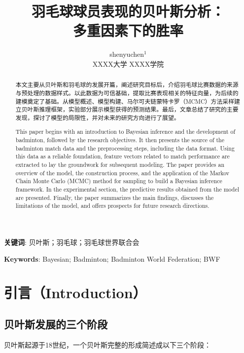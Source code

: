 \documentclass[12pt]{article}
\begin{document}
\title{羽毛球球员表现的贝叶斯分析：\\ 多重因素下的胜率}		%
\date{}

\author{shenyuchen$^1$		\\		XXXX大学 XXXX学院}		%
\maketitle

\renewcommand{\abstractname}{摘要}
\begin{abstract}
	本文主要从贝叶斯和羽毛球的发展开篇，阐述研究目标后，介绍羽毛球比赛数据的来源与预处理的数据样式。以此数据为可信基础，提取比赛表现相关的特征向量，为后续的建模奠定了基础。从模型概述、模型构建、马尔可夫链蒙特卡罗（MCMC）方法采样建立贝叶斯推理框架，实验部分展示模型获得的预测结果。最后，文章总结了研究的主要发现，探讨了模型的局限性，并对未来的研究方向进行了展望。
\end{abstract}

\textbf{关键词}: 贝叶斯；羽毛球；羽毛球世界联合会

\renewcommand{\abstractname}{Abstract}
\begin{abstract}
	This paper begins with an introduction to Bayesian inference and the development of badminton, followed by the research objectives. It then presents the source of the badminton match data and the preprocessing steps, including the data format. Using this data as a reliable foundation, feature vectors related to match performance are extracted to lay the groundwork for subsequent modeling. The paper provides an overview of the model, the construction process, and the application of the Markov Chain Monte Carlo (MCMC) method for sampling to build a Bayesian inference framework. In the experimental section, the predictive results obtained from the model are presented. Finally, the paper summarizes the main findings, discusses the limitations of the model, and offers prospects for future research directions.
\end{abstract}

\textbf{Keywords}: Bayesian; Badminton; Badminton World Federation; BWF


\section{引言（Introduction）}
\subsection{贝叶斯发展的三个阶段}
贝叶斯起源于18世纪，一个贝叶斯完整的形成简述成以下三个阶段：
\end{document}
